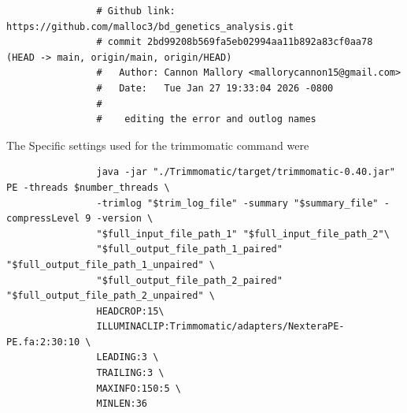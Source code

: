 \documentclass{article}
\begin{document}
\begin{itemize}
            \begin{verbatim}
                # Github link: https://github.com/malloc3/bd_genetics_analysis.git
                # commit 2bd99208b569fa5eb02994aa11b892a83cf0aa78 (HEAD -> main, origin/main, origin/HEAD)
                #   Author: Cannon Mallory <mallorycannon15@gmail.com>
                #   Date:   Tue Jan 27 19:33:04 2026 -0800
                #
                #    editing the error and outlog names
            \end{verbatim}

            The Specific settings used for the trimmomatic command were
            \begin{verbatim}
                java -jar "./Trimmomatic/target/trimmomatic-0.40.jar" PE -threads $number_threads \
                -trimlog "$trim_log_file" -summary "$summary_file" -compressLevel 9 -version \
                "$full_input_file_path_1" "$full_input_file_path_2"\
                "$full_output_file_path_1_paired" "$full_output_file_path_1_unpaired" \
                "$full_output_file_path_2_paired" "$full_output_file_path_2_unpaired" \
                HEADCROP:15\
                ILLUMINACLIP:Trimmomatic/adapters/NexteraPE-PE.fa:2:30:10 \
                LEADING:3 \
                TRAILING:3 \
                MAXINFO:150:5 \
                MINLEN:36


\end{verbatim}
\end{itemize}
\end{document}

